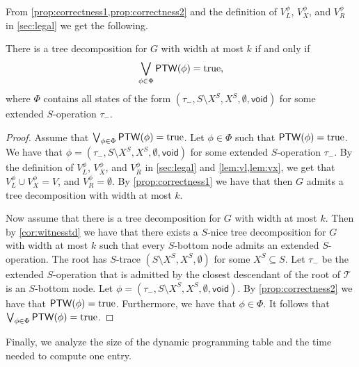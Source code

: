 \documentclass[a4paper,UKenglish,cleveref, autoref, thm-restate, numberwithinsect]{lipics-v2021}
\newcommand{\void}{\mathsf{void}}
\newcommand{\ptw}{\mathsf{PTW}}
\newcommand{\true}{\textup{true}}
\newcommand{\slim}{\text{slim}\xspace}
\begin{document}
From \cref{prop:correctness1,prop:correctness2} and the definition of $V^\phi_L$, $V^\phi_X$, and $V^\phi_R$ in \cref{sec:legal} we get the following.

\begin{corollary}\label{cor:correct}
There is a tree decomposition for $G$ with width at most $k$ if and only if
\[
\bigvee_{\phi\in\Phi}\ptw(\phi)=\true,
\]
where $\Phi$ contains all states of the form $(\tau_-,S\setminus X^S, X^S, \emptyset,\void)$ for some extended $S$-operation $\tau_-$.
\end{corollary}
\begin{proof}
    Assume that $\bigvee_{\phi\in\Phi}\ptw(\phi)=\true$. Let $\phi\in\Phi$ such that $\ptw(\phi)=\true$. We have that $\phi=(\tau_-,S\setminus X^S, X^S,\emptyset,\void)$ for some extended $S$-operation $\tau_-$. By the definition of $V^\phi_L$, $V^\phi_X$, and $V^\phi_R$ in \cref{sec:legal} and \cref{lem:vl,lem:vx}, we get that $V^\phi_L\cup V^\phi_X=V$, and $V^\phi_R=\emptyset$. By \cref{prop:correctness1} we have that then $G$ admits a tree decomposition with width at most $k$.

    Now assume that there is a tree decomposition for $G$ with width at most $k$. Then by \cref{cor:witnesstd} we have that there exists a \slim $S$-nice tree decomposition for $G$ with width at most $k$ such that every $S$-bottom node admits an extended $S$-operation.
The root has $S$-trace $(S\setminus X^S, X^S,\emptyset)$ for some $X^S\subseteq S$. Let $\tau_-$ be the extended $S$-operation that is admitted by the closest descendant of the root of $\mathcal{T}$ is an $S$-bottom node. Let $\phi=(\tau_-,S\setminus X^S, X^S,\emptyset,\void)$. By \cref{prop:correctness2} we have that $\ptw(\phi)=\true$. Furthermore, we have that $\phi\in\Phi$. It follows that $\bigvee_{\phi\in\Phi}\ptw(\phi)=\true$.
\end{proof}


Finally, we analyze the size of the dynamic programming table and the time needed to compute one entry.
\end{document}
